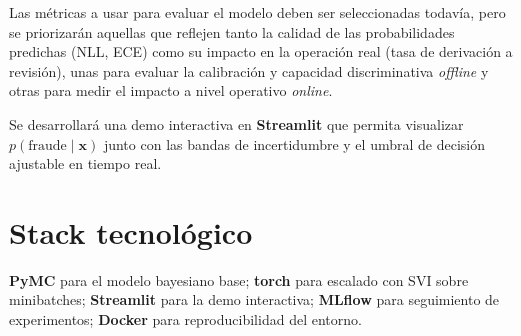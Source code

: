 \documentclass[11pt, a4paper]{article}
\begin{document}
Las métricas a usar para evaluar el modelo deben ser seleccionadas todavía, pero se priorizarán aquellas que reflejen tanto la calidad de las probabilidades predichas (NLL, ECE) como su impacto en la operación real (tasa de derivación a revisión), unas para evaluar la calibración y capacidad discriminativa \textit{offline} y otras para medir el impacto a nivel operativo \textit{online}.

Se desarrollará una demo interactiva en \textbf{Streamlit} que permita visualizar $p(\text{fraude} \mid \mathbf{x})$ junto con las bandas de incertidumbre y el umbral de decisión ajustable en tiempo real.

\section{Stack tecnológico}

\textbf{PyMC} para el modelo bayesiano base; \textbf{torch} para escalado con SVI sobre minibatches; \textbf{Streamlit} para la demo interactiva; \textbf{MLflow} para seguimiento de experimentos; \textbf{Docker} para reproducibilidad del entorno.
\end{document}
